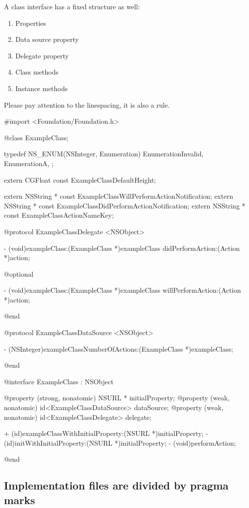 \documentclass[10pt]{extarticle}
\newenvironment{codelisting}
{\footnotesize\mdframed[middlelinewidth=0.5pt, middlelinecolor=BaliHaiColor, skipabove=15pt]\verbatim}
{\endverbatim\endmdframed\vspace{12pt}\normalsize}
\begin{document}
A class interface has a fixed structure as well:

\begin{enumerate}
\item Properties
\item Data source property
\item Delegate property
\item Class methods
\item Instance methods
\end{enumerate}

Please pay attention to the linespacing, it is also a rule.

\begin{codelisting}
#import <Foundation/Foundation.h>

@class ExampleClass;


typedef NS_ENUM(NSInteger, Enumeration) {
    EnumerationInvalid,
    EnumerationA,
};

extern CGFloat const ExampleClassDefaultHeight;

extern NSString * const ExampleClassWillPerformActionNotification;
extern NSString * const ExampleClassDidPerformActionNotification;
extern NSString * const ExampleClassActionNameKey;


@protocol ExampleClassDelegate <NSObject>

- (void)exampleClass:(ExampleClass *)exampleClass didPerformAction:(Action *)action;

@optional

- (void)exampleClass:(ExampleClass *)exampleClass willPerformAction:(Action *)action;

@end


@protocol ExampleClassDataSource <NSObject>

- (NSInteger)exampleClassNumberOfActions:(ExampleClass *)exampleClass;

@end


@interface ExampleClass : NSObject

@property (strong, nonatomic) NSURL * initialProperty;
@property (weak, nonatomic) id<ExampleClassDataSource> dataSource;
@property (weak, nonatomic) id<ExampleClassDelegate> delegate;

+ (id)exampleClassWithInitialProperty:(NSURL *)initialProperty;
- (id)initWithInitialProperty:(NSURL *)initialProperty;
- (void)performAction;

@end
\end{codelisting}


\subsection{Implementation files are divided by pragma marks}
\end{document}
